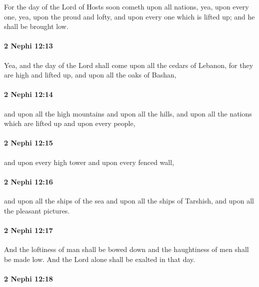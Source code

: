 			For the day of the Lord of Hosts soon cometh upon all nations,
			yea, upon every one, yea, upon the proud and lofty,
			and upon every one which is lifted up;
			and he shall be brought low.

		\paragraph{2 Nephi 12:13} %
			\label{2NEPHI-12-13}

			Yea, and the day of the Lord shall come upon all the cedars of Lebanon,
			for they are high and lifted up,
			and upon all the oaks of Bashan,

		\paragraph{2 Nephi 12:14} %
			\label{2NEPHI-12-14}

			and upon all the high mountains and upon all the hills,
			and upon all the nations which are lifted up and upon every people,

		\paragraph{2 Nephi 12:15} %
			\label{2NEPHI-12-15}

			and upon every high tower and upon every fenced wall,

		\paragraph{2 Nephi 12:16} %
			\label{2NEPHI-12-16}

			and upon all the ships of the sea and upon all the ships of Tarshish,
			and upon all the pleasant pictures.

		\paragraph{2 Nephi 12:17} %
			\label{2NEPHI-12-17}

			And the loftiness of man shall be bowed down
			and the haughtiness of men shall be made low.
			And the Lord alone shall be exalted in that day.

		\paragraph{2 Nephi 12:18} %
			\label{2NEPHI-12-18}

